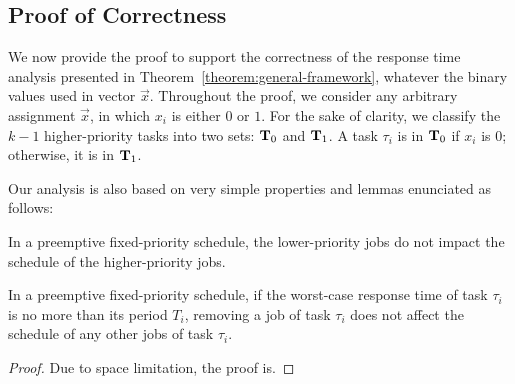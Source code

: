 \subsection{Proof of Correctness}  
\label{sec:proof-th1}

We now provide the proof to support the correctness of the response time analysis presented in
Theorem~\ref{theorem:general-framework}, whatever the binary values
used in vector $\vec{x}$.  %
Throughout the proof, we consider any arbitrary assignment
$\vec{x}$, in which $x_i$ is either $0$ or $1$. For the sake of clarity, we classify the $k-1$
higher-priority tasks into two sets: ${\bf T}_0$ and ${\bf T}_1$. A
task $\tau_i$ is in ${\bf T}_0$ if $x_i$ is $0$; otherwise, it is in
${\bf T}_1$.




Our analysis is also based on very simple properties and lemmas enunciated as follows:

\begin{Property}
\label{prop:lower-priority}
In a preemptive fixed-priority schedule, the lower-priority jobs do not impact the schedule of the higher-priority jobs.
\end{Property}


\begin{Lemma}
\label{lemma:remove-same-task}
In a preemptive fixed-priority schedule, if the worst-case response
time of task $\tau_i$ is no more than its period $T_i$, removing a job of task $\tau_i$ does not affect the schedule of any other jobs of task $\tau_i$.
\end{Lemma}
\begin{proof}
Due to space limitation, the proof is\citetechreport{}.
\end{proof}


